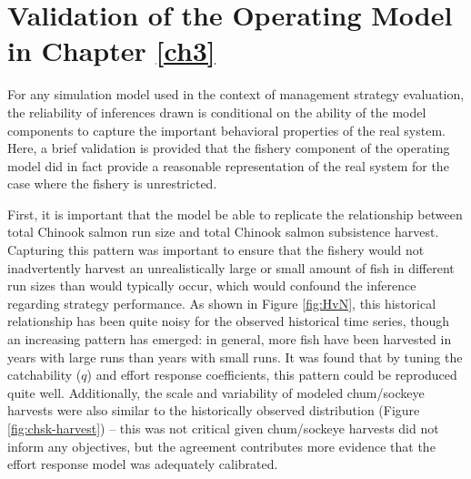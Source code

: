 \documentclass[12pt,]{book}
\theoremstyle{definition}
\theoremstyle{definition}
\theoremstyle{definition}
\theoremstyle{remark}
\begin{document}
\clearpage

\doublespacing

\chapter{Validation of the Operating Model in Chapter
\ref{ch3}}\label{appendix-b}

\noindent
For any simulation model used in the context of management strategy
evaluation, the reliability of inferences drawn is conditional on the
ability of the model components to capture the important behavioral
properties of the real system. Here, a brief validation is provided that
the fishery component of the operating model did in fact provide a
reasonable representation of the real system for the case where the
fishery is unrestricted.

First, it is important that the model be able to replicate the
relationship between total Chinook salmon run size and total Chinook
salmon subsistence harvest. Capturing this pattern was important to
ensure that the fishery would not inadvertently harvest an
unrealistically large or small amount of fish in different run sizes
than would typically occur, which would confound the inference regarding
strategy performance. As shown in Figure \ref{fig:HvN}, this historical
relationship has been quite noisy for the observed historical time
series, though an increasing pattern has emerged: in general, more fish
have been harvested in years with large runs than years with small runs.
It was found that by tuning the catchability (\(q\)) and effort response
coefficients, this pattern could be reproduced quite well. Additionally,
the scale and variability of modeled chum/sockeye harvests were also
similar to the historically observed distribution (Figure
\ref{fig:chsk-harvest}) -- this was not critical given chum/sockeye
harvests did not inform any objectives, but the agreement contributes
more evidence that the effort response model was adequately calibrated.
\end{document}
